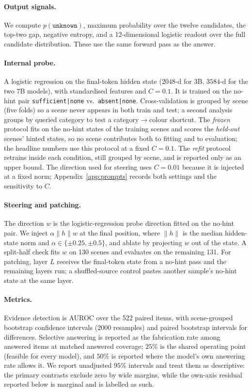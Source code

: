 \documentclass[10pt]{article}
\newcommand{\unknown}{\texttt{unknown}}
\newcommand{\punk}{p(\unknown)}
\newcommand{\wdir}{w}
\begin{document}
\paragraph{Output signals.} We compute $\punk$, maximum probability over the twelve candidates, the top-two gap, negative entropy, and a 12-dimensional logistic readout over the full candidate distribution. These use the same forward pass as the answer.

\paragraph{Internal probe.} A logistic regression on the final-token hidden state ($2048$-d for 3B, $3584$-d for the two 7B models), with standardised features and $C=0.1$. It is trained on the no-hint pair \texttt{sufficient|none} vs.\ \texttt{absent|none}. Cross-validation is grouped by scene (five folds) so a scene never appears in both train and test; a second analysis groups by queried category to test a category$\to$colour shortcut. The \emph{frozen} protocol fits on the no-hint states of the training scenes and scores the \emph{held-out} scenes' hinted states, so no scene contributes both to fitting and to evaluation; the headline numbers use this protocol at a fixed $C=0.1$. The \emph{refit} protocol retrains inside each condition, still grouped by scene, and is reported only as an upper bound. The direction used for steering uses $C=0.01$ because it is injected at a fixed norm; Appendix~\ref{app:prompts} records both settings and the sensitivity to $C$.

\paragraph{Steering and patching.} The direction $\wdir$ is the logistic-regression probe direction fitted on the no-hint pair. We inject $\alpha\lVert h\rVert\wdir$ at the final position, where $\lVert h\rVert$ is the median hidden-state norm and $\alpha\in\{\pm0.25,\pm0.5\}$, and ablate by projecting $\wdir$ out of the state. A split-half check fits $\wdir$ on 130 scenes and evaluates on the remaining 131. For patching, layer $L$ receives the final-token state from a no-hint pass and the remaining layers run; a shuffled-source control pastes another sample's no-hint state at the same layer.

\paragraph{Metrics.} Evidence detection is AUROC over the 522 paired items, with scene-grouped bootstrap confidence intervals (2000 resamples) and paired bootstrap intervals for differences. Selective answering is reported as the fabrication rate among answered items at matched answered coverage; $25\%$ is the shared operating point (feasible for every model), and $50\%$ is reported where the model's own answering rate allows it. We report unadjusted $95\%$ intervals and treat them as descriptive: the primary contrasts exclude zero by wide margins, while the own-axis residual reported below is marginal and is labelled as such.
\end{document}
